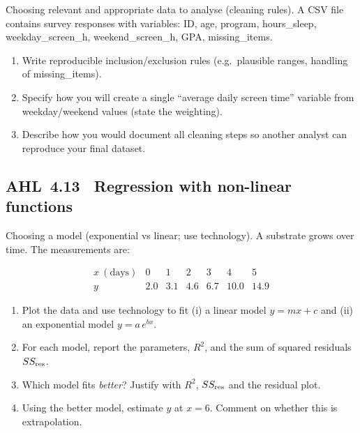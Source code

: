 \documentclass[11pt]{article}
\def\textbf#1{#1}%
\newcommand{\tocsubsection}[1]{\subsection{#1}}
\newcounter{question}
\begin{document}
\begin{question}
\textbf{Choosing relevant and appropriate data to analyse (cleaning rules).}
A CSV file contains survey responses with variables: ID, age, program, hours\_sleep, weekday\_screen\_h, weekend\_screen\_h, GPA, missing\_items.
\begin{enumerate}
  \item Write reproducible inclusion/exclusion rules (e.g.\ plausible ranges, handling of missing\_items).
  \item Specify how you will create a single “average daily screen time” variable from weekday/weekend values (state the weighting).
  \item Describe how you would document all cleaning steps so another analyst can reproduce your final dataset.
\end{enumerate}
\end{question}
\tocsubsection{AHL 4.13 \; Regression with non-linear functions}


\begin{question}
\textbf{Choosing a model (exponential vs linear; use technology).}
A substrate grows over time. The measurements are:

\[
\begin{array}{c|cccccc}
x\ (\text{days}) & 0 & 1 & 2 & 3 & 4 & 5\\\hline
y & 2.0 & 3.1 & 4.6 & 6.7 & 10.0 & 14.9
\end{array}
\]

\begin{enumerate}
  \item Plot the data and use technology to fit (i) a linear model $y=mx+c$ and (ii) an exponential model $y=a\,e^{bx}$.
  \item For each model, report the parameters, $R^2$, and the sum of squared residuals $SS_{\rm res}$.
  \item Which model fits \emph{better}? Justify with $R^2$, $SS_{\rm res}$ and the residual plot.
  \item Using the better model, estimate $y$ at $x=6$. Comment on whether this is extrapolation.
\end{enumerate}

\begin{center}
\end{center}
\end{question}
\end{document}
